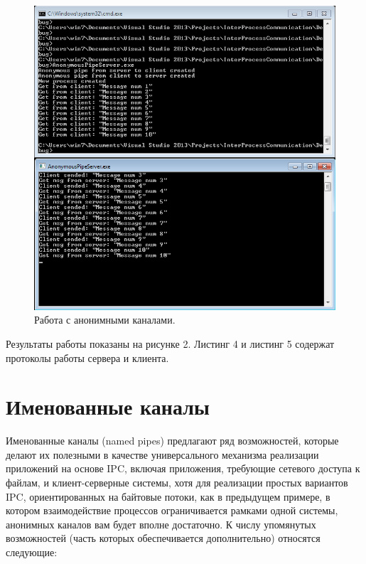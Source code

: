 \documentclass[a4paper, 12pt]{report}		%
\begin{document}
\begin{figure}[h!]
\centering
\includegraphics[scale=0.95]{res/02_anonymous_channels}
\caption{Работа с анонимными каналами.}
\end{figure}
\newpage

Результаты работы показаны на рисунке 2. Листинг 4 и листинг 5 содержат протоколы работы сервера и клиента.





\chapter*{Именованные каналы}

Именованные каналы (named pipes) предлагают ряд возможностей, которые делают их полезными в качестве универсального механизма реализации приложений на основе IPC, включая приложения, требующие сетевого доступа к файлам, и клиент-серверные системы, хотя для реализации простых вариантов IPC, ориентированных на байтовые потоки, как в предыдущем примере, в котором взаимодействие процессов ограничивается рамками одной системы, анонимных каналов вам будет вполне достаточно. К числу упомянутых возможностей (часть которых обеспечивается дополнительно) относятся следующие:
\end{document}
